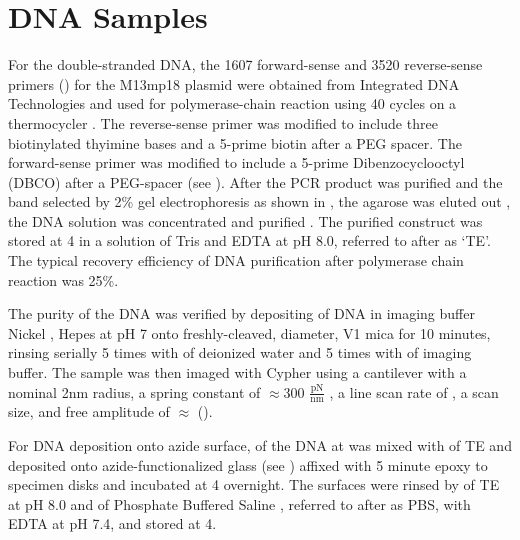 \section{DNA Samples}

For the  double-stranded DNA, the 1607 forward-sense and 3520 reverse-sense primers () for the M13mp18 plasmid  were obtained from Integrated DNA Technologies  and used for polymerase-chain reaction  using 40 cycles on a thermocycler . The reverse-sense primer was modified to include three biotinylated thyimine bases and a 5-prime biotin after a PEG spacer. The forward-sense primer was modified to include a 5-prime Dibenzocyclooctyl (DBCO) after a PEG-spacer (see ). After the PCR product was purified  and the  band selected by 2\% gel electrophoresis  as shown in , the agarose was eluted out , the DNA solution was concentrated  and purified . The purified construct was stored at 4\degreeC{} in a solution of  Tris  and  EDTA  at pH 8.0, referred to after as `TE'. The typical recovery efficiency of DNA purification after polymerase chain reaction was 25\%. 

The purity of the DNA was verified by depositing  of DNA in imaging buffer \textemdash{}  Nickel ,  Hepes  at pH 7 \textemdash{} onto freshly-cleaved,  diameter, V1 mica  for 10 minutes, rinsing serially 5 times with  of deionized water and 5 times with  of imaging buffer. The sample was then imaged with Cypher using a cantilever with a nominal 2nm radius, a spring constant of $\approx$300 $\frac{\text{pN}}{\text{nm}}$ , a line scan rate of , a  scan size, and free amplitude of $\approx$ (). 

For DNA deposition onto azide surface,  of the DNA at  was mixed with  of TE and deposited onto azide-functionalized glass (see ) affixed with 5 minute epoxy  to specimen disks  and incubated at 4\degreeC{} overnight. The surfaces were rinsed by  of TE at pH 8.0 and  of Phosphate Buffered Saline , referred to after as PBS, with  EDTA at pH 7.4, and stored at 4\degreeC{}. 

